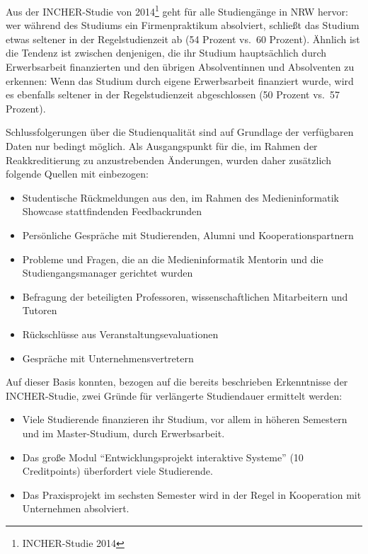 Aus der INCHER-Studie von 2014\footnote{INCHER-Studie 2014} geht für
alle Studiengänge in NRW hervor: wer während des Studiums ein
Firmenpraktikum absolviert, schließt das Studium etwas seltener in der
Regelstudienzeit ab (54 Prozent vs.~60 Prozent). Ähnlich ist die Tendenz
ist zwischen denjenigen, die ihr Studium hauptsächlich durch
Erwerbsarbeit finanzierten und den übrigen Absolventinnen und
Absolventen zu erkennen: Wenn das Studium durch eigene Erwerbsarbeit
finanziert wurde, wird es ebenfalls seltener in der Regelstudienzeit
abgeschlossen (50 Prozent vs.~57 Prozent).

Schlussfolgerungen über die Studienqualität sind auf Grundlage der
verfügbaren Daten nur bedingt möglich. Als Ausgangspunkt für die, im
Rahmen der Reakkreditierung zu anzustrebenden Änderungen, wurden daher
zusätzlich folgende Quellen mit einbezogen:

\begin{itemize}
\tightlist
\item
  Studentische Rückmeldungen aus den, im Rahmen des Medieninformatik
  Showcase stattfindenden Feedbackrunden
\item
  Persönliche Gespräche mit Studierenden, Alumni und
  Kooperationspartnern
\item
  Probleme und Fragen, die an die Medieninformatik Mentorin und die
  Studiengangsmanager gerichtet wurden
\item
  Befragung der beteiligten Professoren, wissenschaftlichen Mitarbeitern
  und Tutoren
\item
  Rückschlüsse aus Veranstaltungsevaluationen
\item
  Gespräche mit Unternehmensvertretern
\end{itemize}

Auf dieser Basis konnten, bezogen auf die bereits beschrieben
Erkenntnisse der INCHER-Studie, zwei Gründe für verlängerte Studiendauer
ermittelt werden:

\begin{itemize}
\tightlist
\item
  Viele Studierende finanzieren ihr Studium, vor allem in höheren
  Semestern und im Master-Studium, durch Erwerbsarbeit.
\item
  Das große Modul ``Entwicklungsprojekt interaktive Systeme'' (10
  Creditpoints) überfordert viele Studierende.
\item
  Das Praxisprojekt im sechsten Semester wird in der Regel in
  Kooperation mit Unternehmen absolviert.
\end{itemize}

